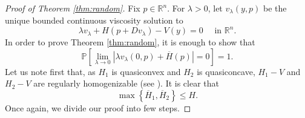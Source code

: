 \documentclass[12pt,reqno]{amsart}
\theoremstyle{plain}
\theoremstyle{remark}
\numberwithin{equation}{section}
\newcommand{\bP}{\mathbb{P}}
\newcommand{\R}{\mathbb{R}}
\newcommand{\lam}{\lambda}
\newcommand{\ol}{\overline}
\begin{document}
\begin{proof}[Proof of Theorem \ref{thm:random}]
Fix $p\in \R^n$.
For $\lam>0$, let $v_\lam(y,p)$ be the unique bounded continuous viscosity solution to
\begin{equation}\label{v-lam}
\lam v_\lam + H(p+Dv_\lam) - V(y) =0 \quad \text{ in } \R^n.
\end{equation}
In order to prove Theorem \ref{thm:random}, it is enough to show that
\begin{equation}\label{random-goal}
\bP \left[ \lim_{\lam\to 0} \left|\lam v_\lam(0,p) + \ol{H}(p)\right|=0\right]=1.
\end{equation}
Let us note first that, as $H_1$ is quasiconvex and $H_2$ is quasiconcave,
$H_1-V$ and $H_2-V$ are regularly homogenizable (see \cite{DaSi, AS3}).
It is clear that
\begin{equation}\label{random-0}
\max\left\{\ol{H}_1, \ol{H}_2 \right\} \leq H.
\end{equation}
Once again, we divide our proof into few steps.
\smallskip


\end{proof}
\end{document}

